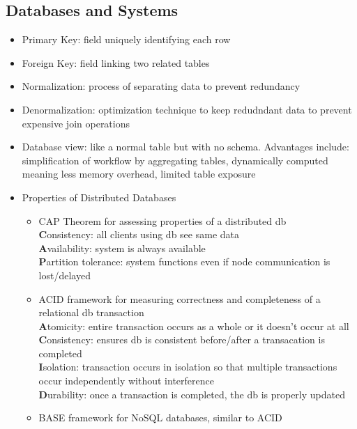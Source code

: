 \documentclass{article}
\begin{document}
\begin{multicols*}{2}
     \section{Databases and Systems}
    \renewcommand\labelitemi{{\boldmath$\cdot$}}
    \begin{itemize}[noitemsep]
        \item Primary Key: field uniquely identifying each row
        \item Foreign Key: field linking two related tables
        \item Normalization: process of separating data to prevent redundancy
        \item Denormalization: optimization technique to keep redudndant data to 
        prevent expensive join operations
        \item Database view: like a normal table but with no schema. Advantages include:
        simplification of workflow by aggregating tables, dynamically computed meaning 
        less memory overhead, limited table exposure
        \item Properties of Distributed Databases
        \begin{itemize}
            \item CAP Theorem for assessing properties of a distributed db \\
            \textbf{C}onsistency: all clients using db see same data \\
            \textbf{A}vailability: system is always available \\
            \textbf{P}artition tolerance: system functions
            even if node communication is lost/delayed
            \item ACID framework for measuring correctness and completeness of a relational db transaction \\
            \textbf{A}tomicity: entire transaction occurs as a whole or it doesn't occur at all \\
            \textbf{C}onsistency: ensures db is consistent before/after a transacation is completed \\
            \textbf{I}solation: transaction occurs in isolation so that 
            multiple transactions occur independently without interference \\
            \textbf{D}urability: once a transaction is completed, the db is properly updated
            \item BASE framework for NoSQL databases, similar to ACID \\

\end{itemize}
\end{itemize}
\end{multicols*}
\end{document}
